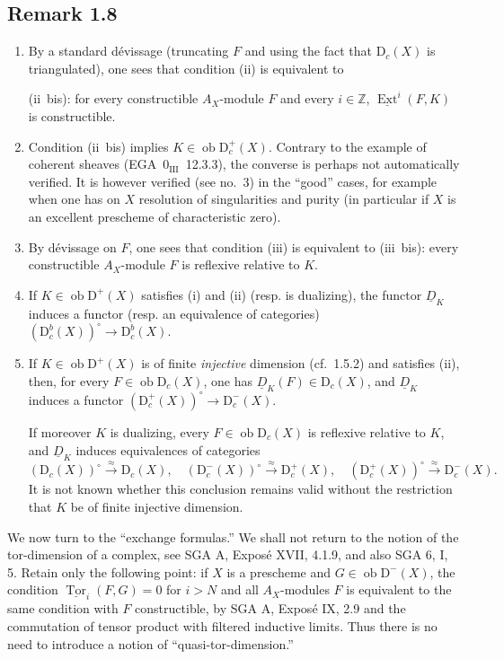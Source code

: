 \documentclass[11pt]{article}
\DeclareMathOperator{\Ext}{Ext}
\DeclareMathOperator{\Tor}{Tor}
\newcommand{\D}{\mathrm{D}}
\newcommand{\Z}{\mathbb{Z}}
\newcommand{\ob}{\operatorname{ob}}
\providecommand{\ob}{\operatorname{ob}}
\providecommand{\Z}{\mathbb Z}
\begin{document}
\subsection*{Remark 1.8}
\begin{enumerate}[label=\alph*)]
\item By a standard dévissage (truncating $F$ and using the fact that $\D_c(X)$ is triangulated), one sees that condition (ii) is equivalent to

(ii~bis): for every constructible $A_X$-module $F$ and every $i \in \Z$, $\underline{\Ext}^i(F,K)$ is constructible.

\item Condition (ii~bis) implies $K \in \ob \D_c^{+}(X)$. Contrary to the example of coherent sheaves (EGA~$0_{\mathrm{III}}$~12.3.3), the converse is perhaps not automatically verified. It is however verified (see no.~3) in the ``good'' cases, for example when one has on $X$ resolution of singularities and purity (in particular if $X$ is an excellent prescheme of characteristic zero).

\item By dévissage on $F$, one sees that condition (iii) is equivalent to (iii~bis): every constructible $A_X$-module $F$ is reflexive relative to $K$.

\item If $K \in \ob \D^{+}(X)$ satisfies (i) and (ii) (resp. is dualizing), the functor $\underline{D}_K$ induces a functor (resp. an equivalence of categories) $(\D_c^{b}(X))^{\circ} \to \D_c^{b}(X)$.

\item If $K \in \ob \D^{+}(X)$ is of finite \emph{injective} dimension (cf.~1.5.2) and satisfies (ii), then, for every $F \in \ob \D_c(X)$, one has $\underline{D}_K(F) \in \D_c(X)$, and $\underline{D}_K$ induces a functor $(\D_c^{+}(X))^{\circ} \to \D_c^{-}(X)$.

If moreover $K$ is dualizing, every $F \in \ob \D_c(X)$ is reflexive relative to $K$, and $\underline{D}_K$ induces equivalences of categories
\[
(\D_c(X))^{\circ} \xrightarrow{\approx} \D_c(X), \quad (\D_c^{-}(X))^{\circ} \xrightarrow{\approx} \D_c^{+}(X), \quad (\D_c^{+}(X))^{\circ} \xrightarrow{\approx} \D_c^{-}(X).
\]
It is not known whether this conclusion remains valid without the restriction that $K$ be of finite injective dimension.
\end{enumerate}

We now turn to the ``exchange formulas.'' We shall not return to the notion of the tor-dimension of a complex, see SGA A, Exposé XVII, 4.1.9, and also SGA 6, I, 5. Retain only the following point: if $X$ is a prescheme and $G\in\ob\D^-(X)$, the condition $\underline{\Tor}_i(F,G)=0$ for $i>N$ and all $A_X$-modules $F$ is equivalent to the same condition with $F$ constructible, by SGA A, Exposé IX, 2.9 and the commutation of tensor product with filtered inductive limits. Thus there is no need to introduce a notion of ``quasi-tor-dimension.''
\end{document}
